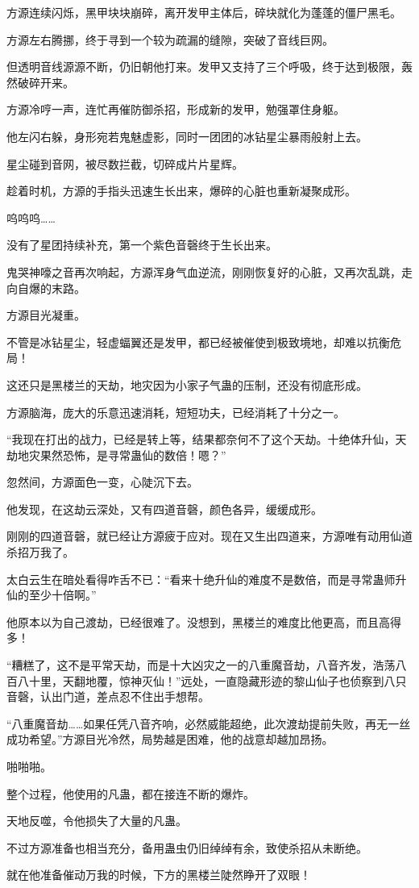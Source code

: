 \begin{this_body}
方源连续闪烁，黑甲块块崩碎，离开发甲主体后，碎块就化为蓬蓬的僵尸黑毛。

方源左右腾挪，终于寻到一个较为疏漏的缝隙，突破了音线巨网。

但透明音线源源不断，仍旧朝他打来。发甲又支持了三个呼吸，终于达到极限，轰然破碎开来。

方源冷哼一声，连忙再催防御杀招，形成新的发甲，勉强罩住身躯。

他左闪右躲，身形宛若鬼魅虚影，同时一团团的冰钻星尘暴雨般射上去。

星尘碰到音网，被尽数拦截，切碎成片片星辉。

趁着时机，方源的手指头迅速生长出来，爆碎的心脏也重新凝聚成形。

呜呜呜……

没有了星团持续补充，第一个紫色音磬终于生长出来。

鬼哭神嚎之音再次响起，方源浑身气血逆流，刚刚恢复好的心脏，又再次乱跳，走向自爆的末路。

方源目光凝重。

不管是冰钻星尘，轻虚蝠翼还是发甲，都已经被催使到极致境地，却难以抗衡危局！

这还只是黑楼兰的天劫，地灾因为小家子气蛊的压制，还没有彻底形成。

方源脑海，庞大的乐意迅速消耗，短短功夫，已经消耗了十分之一。

“我现在打出的战力，已经是转上等，结果都奈何不了这个天劫。十绝体升仙，天劫地灾果然恐怖，是寻常蛊仙的数倍！嗯？”

忽然间，方源面色一变，心陡沉下去。

他发现，在这劫云深处，又有四道音磬，颜色各异，缓缓成形。

刚刚的四道音磬，就已经让方源疲于应对。现在又生出四道来，方源唯有动用仙道杀招万我了。

太白云生在暗处看得咋舌不已：“看来十绝升仙的难度不是数倍，而是寻常蛊师升仙的至少十倍啊。”

他原本以为自己渡劫，已经很难了。没想到，黑楼兰的难度比他更高，而且高得多！

“糟糕了，这不是平常天劫，而是十大凶灾之一的八重魔音劫，八音齐发，浩荡八百八十里，天翻地覆，惊神灭仙！”远处，一直隐藏形迹的黎山仙子也侦察到八只音磬，认出门道，差点忍不住出手想帮。

“八重魔音劫……如果任凭八音齐响，必然威能超绝，此次渡劫提前失败，再无一丝成功希望。”方源目光冷然，局势越是困难，他的战意却越加昂扬。

啪啪啪。

整个过程，他使用的凡蛊，都在接连不断的爆炸。

天地反噬，令他损失了大量的凡蛊。

不过方源准备也相当充分，备用蛊虫仍旧绰绰有余，致使杀招从未断绝。

就在他准备催动万我的时候，下方的黑楼兰陡然睁开了双眼！

\end{this_body}

